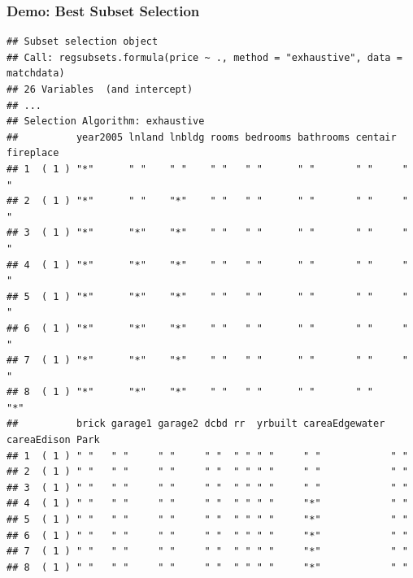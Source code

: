 \documentclass[
  shownotes,
  xcolor={svgnames},
  hyperref={colorlinks,citecolor=DarkBlue,linkcolor=DarkRed,urlcolor=DarkBlue}
  , aspectratio=169]{beamer}
\begin{document}
\begin{frame}[fragile]
\frametitle{Demo: Best Subset Selection}

\begin{tiny}
\begin{verbatim}
## Subset selection object
## Call: regsubsets.formula(price ~ ., method = "exhaustive", data = matchdata)
## 26 Variables  (and intercept)
## ...
## Selection Algorithm: exhaustive
##          year2005 lnland lnbldg rooms bedrooms bathrooms centair fireplace
## 1  ( 1 ) "*"      " "    " "    " "   " "      " "       " "     " "      
## 2  ( 1 ) "*"      " "    "*"    " "   " "      " "       " "     " "      
## 3  ( 1 ) "*"      "*"    "*"    " "   " "      " "       " "     " "      
## 4  ( 1 ) "*"      "*"    "*"    " "   " "      " "       " "     " "      
## 5  ( 1 ) "*"      "*"    "*"    " "   " "      " "       " "     " "      
## 6  ( 1 ) "*"      "*"    "*"    " "   " "      " "       " "     " "      
## 7  ( 1 ) "*"      "*"    "*"    " "   " "      " "       " "     " "      
## 8  ( 1 ) "*"      "*"    "*"    " "   " "      " "       " "     "*"      
##          brick garage1 garage2 dcbd rr  yrbuilt careaEdgewater careaEdison Park
## 1  ( 1 ) " "   " "     " "     " "  " " " "     " "            " "             
## 2  ( 1 ) " "   " "     " "     " "  " " " "     " "            " "             
## 3  ( 1 ) " "   " "     " "     " "  " " " "     " "            " "             
## 4  ( 1 ) " "   " "     " "     " "  " " " "     "*"            " "             
## 5  ( 1 ) " "   " "     " "     " "  " " " "     "*"            " "             
## 6  ( 1 ) " "   " "     " "     " "  " " " "     "*"            " "             
## 7  ( 1 ) " "   " "     " "     " "  " " " "     "*"            " "             
## 8  ( 1 ) " "   " "     " "     " "  " " " "     "*"            " "      
\end{verbatim}
\end{tiny}
\end{frame}
\end{document}
